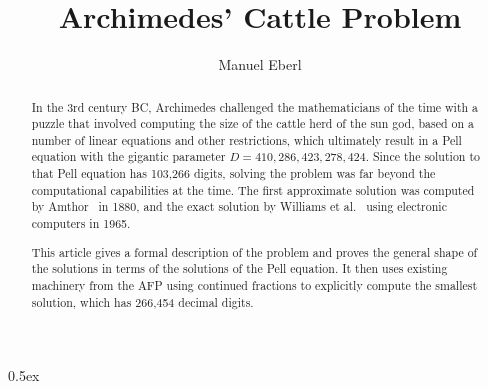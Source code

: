\documentclass[11pt,a4paper]{article}
\begin{document}
\title{Archimedes' Cattle Problem}
\author{Manuel Eberl}
\maketitle

\begin{abstract}
In the 3rd century BC, Archimedes challenged the mathematicians of the time with a puzzle that 
involved computing the size of the cattle herd of the sun god, based on a number of linear 
equations and other restrictions, which ultimately result in a Pell equation with the gigantic 
parameter $D = 410{,}286{,}423{,}278{,}424$. Since the solution to that Pell equation has 
103{,}266 digits, solving the problem was far beyond the computational capabilities at the time.
The first approximate solution was computed by Amthor~\cite{amthor} in 1880, and the exact
solution by Williams et al.~\cite{williams} using electronic computers in 1965.

This article gives a formal description of the problem and proves the general shape of the 
solutions in terms of the solutions of the Pell equation. It then uses existing machinery from 
the AFP using continued fractions to explicitly compute the smallest solution, which has
266{,}454 decimal digits.
\end{abstract}

\newpage

\tableofcontents

\newpage
\parindent 0pt\parskip 0.5ex



\raggedright

\nocite{nelson,amthor,williams}


\end{document}
